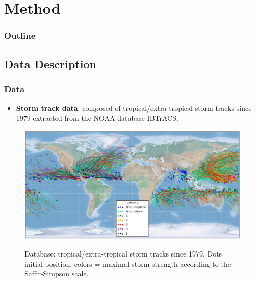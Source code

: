 \documentclass{beamer}
\begin{document}
 \section{Method}
 \begin{frame}
 \frametitle{Outline} %
 \tableofcontents[currentsection] %
\end{frame}
\subsection{Data Description}
\begin{frame}
\frametitle{Data}
\begin{itemize}
	\item  \textbf{Storm track data}: composed of tropical/extra-tropical storm tracks since 1979 extracted from the NOAA database IBTrACS. \\
\end{itemize}
\begin{figure}
	\includegraphics[width=0.7\linewidth, height=0.5\textheight]{figs/all_storms.png}
	\label{fig: storm_tracks}
	\caption{Database: tropical/extra-tropical storm tracks since 1979. Dots = initial position, colors = maximal storm strength according to the Saffir-Simpson scale.}
\end{figure}
\end{frame}
\end{document}
